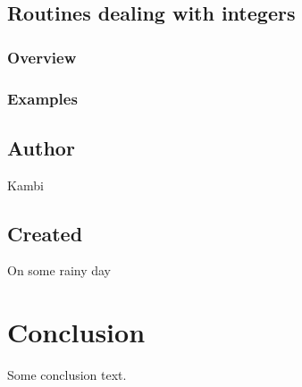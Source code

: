 \documentclass{report}
\newif\ifpdf
\begin{document}
\section{Routines dealing with integers}


\label{SecIntegersOverview}
\ifpdf
\subsection*{\large{\textbf{Overview}}\normalsize\hspace{1ex}\hrulefill}\else
\subsection*{Overview}
\fi


\label{SecIntegersExamples}
\ifpdf
\subsection*{\large{\textbf{Examples}}\normalsize\hspace{1ex}\hrulefill}\else
\subsection*{Examples}
\fi
\section{Author}
\par
Kambi

\section{Created}
\par
On some rainy day


\chapter{Conclusion}
\label{ok_conclusion}
Some conclusion text.
\end{document}
